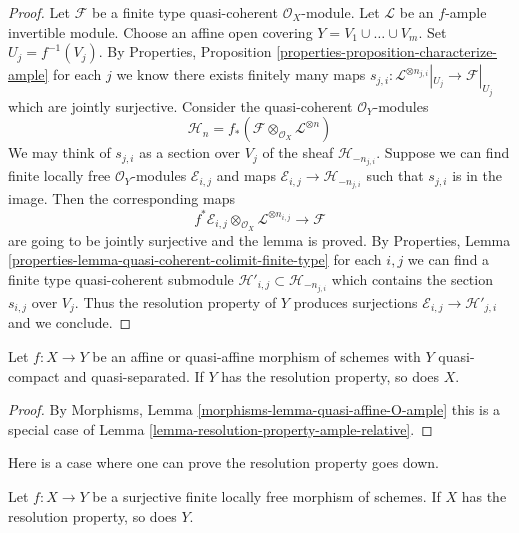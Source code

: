 \begin{proof}
Let $\mathcal{F}$ be a finite type quasi-coherent $\mathcal{O}_X$-module.
Let $\mathcal{L}$ be an $f$-ample invertible module.
Choose an affine open covering $Y = V_1 \cup \ldots \cup V_m$.
Set $U_j = f^{-1}(V_j)$. By Properties, Proposition
\ref{properties-proposition-characterize-ample}
for each $j$ we know there exists finitely many maps
$s_{j, i} : \mathcal{L}^{\otimes n_{j, i}}|_{U_j} \to \mathcal{F}|_{U_j}$
which are jointly surjective. Consider the quasi-coherent
$\mathcal{O}_Y$-modules
$$
\mathcal{H}_n =
f_*(\mathcal{F} \otimes_{\mathcal{O}_X} \mathcal{L}^{\otimes n})
$$
We may think of $s_{j, i}$ as a section over $V_j$ of the sheaf
$\mathcal{H}_{-n_{j, i}}$. Suppose we can find finite locally
free $\mathcal{O}_Y$-modules $\mathcal{E}_{i, j}$ and maps
$\mathcal{E}_{i, j} \to \mathcal{H}_{-n_{j, i}}$ such that
$s_{j, i}$ is in the image. Then the corresponding maps
$$
f^*\mathcal{E}_{i, j}
\otimes_{\mathcal{O}_X}
\mathcal{L}^{\otimes n_{i, j}} \longrightarrow \mathcal{F}
$$
are going to be jointly surjective and the lemma is proved. By
Properties, Lemma \ref{properties-lemma-quasi-coherent-colimit-finite-type}
for each $i, j$ we can find a finite
type quasi-coherent submodule
$\mathcal{H}'_{i, j} \subset  \mathcal{H}_{-n_{j, i}}$
which contains the section $s_{i, j}$ over $V_j$.
Thus the resolution property of $Y$ produces surjections
$\mathcal{E}_{i, j} \to \mathcal{H}'_{j, i}$ and we conclude.
\end{proof}

\begin{lemma}
\label{lemma-resolution-property-goes-up-affine}
Let $f : X \to Y$ be an affine or quasi-affine morphism of schemes with
$Y$ quasi-compact and quasi-separated.
If $Y$ has the resolution property, so does $X$.
\end{lemma}

\begin{proof}
By Morphisms, Lemma \ref{morphisms-lemma-quasi-affine-O-ample}
this is a special case of
Lemma \ref{lemma-resolution-property-ample-relative}.
\end{proof}

\noindent
Here is a case where one can prove the resolution property goes down.

\begin{lemma}
\label{lemma-resolution-property-goes-down-finite-flat}
Let $f : X \to Y$ be a surjective finite locally free morphism of schemes.
If $X$ has the resolution property, so does $Y$.
\end{lemma}

